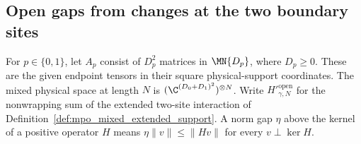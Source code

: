 
\subsection{Open gaps from changes at the two boundary sites}

For $p\in\{0,1\}$, let $A_p$ consist of $D_p^2$ matrices in
$\MN{D_p}$, where $D_p\geq0$. These are the given endpoint tensors
in their square physical-support coordinates. The mixed physical space
at length $N$ is $(\C^{(D_0+D_1)^2})^{\otimes N}$.
Write $H'^{\mathrm{open}}_{\gamma,N}$ for the nonwrapping sum of the
extended two-site interaction of Definition~\ref{def:mpo_mixed_extended_support}.
A norm gap $\eta$ above the kernel of a positive operator $H$ means
$\eta\|v\|\leq\|Hv\|$ for every $v\perp\ker H$.

